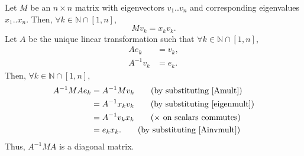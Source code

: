\documentclass{article}
\begin{document}
Let $M$ be an $n \times n$ matrix with eigenvectors $v_1 .. v_n$ and corresponding eigenvalues $x_1 .. x_n$. Then, $\forall k \in \mathbb{N} \cap [1,n]$,
\begin{equation}
  Mv_k = x_k v_k. \label{eigenmult}
\end{equation}
Let $A$ be the unique linear transformation such that $\forall k \in \mathbb{N} \cap [1,n]$,
\begin{align}
  Ae_k      &= v_k, \label{Amult} \\
  A^{-1}v_k &= e_k. \label{Ainvmult}
\end{align}
Then, $\forall k \in \mathbb{N} \cap [1,n]$,
\begin{align*}
  A^{-1}MAe_k &= A^{-1}Mv_k   \tag*{(by substituting \ref{Amult})} \\
              &= A^{-1}x_kv_k \tag*{(by substituting \ref{eigenmult})} \\
              &= A^{-1}v_kx_k \tag*{($\times$ on scalars commutes)} \\
              &= e_kx_k.      \tag*{(by substituting \ref{Ainvmult})}
\end{align*}
Thus, $A^{-1}MA$ is a diagonal matrix.
\end{document}
